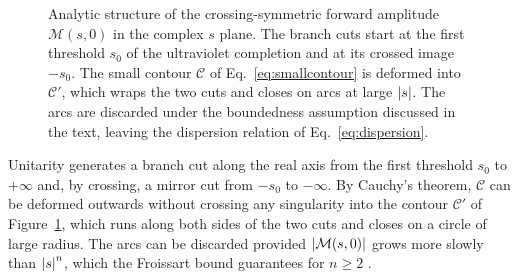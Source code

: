 \begin{figure}[tb]
\centering
{}
\caption[Analytic structure of the forward amplitude $\mathcal M(s,0)$ and the dispersive contour]{Analytic structure of the crossing-symmetric forward amplitude $\mathcal M(s,0)$ in the complex $s$ plane. The
branch cuts start at the first threshold $s_0$ of the ultraviolet completion and at its crossed image
$-s_0$. The small contour $\mathcal C$ of Eq.~\eqref{eq:smallcontour} is deformed into $\mathcal C'$,
which wraps the two cuts and closes on arcs at large $\abs{s}$. The arcs are discarded under the
boundedness assumption discussed in the text, leaving the dispersion relation
of Eq.~\eqref{eq:dispersion}.}
\label{fig:contour}
\end{figure}

Unitarity generates a branch cut along the real axis from the first threshold $s_0$ to $+\infty$
and, by crossing, a mirror cut from $-s_0$ to $-\infty$. By Cauchy's theorem, $\mathcal C$ can be deformed outwards without crossing any singularity into the
contour $\mathcal C'$ of Figure~\ref{fig:contour}, which runs along both sides of the two cuts and
closes on a circle of large radius. The
arcs can be discarded provided $\abs{\mathcal M(s,0)}$ grows more slowly than $\abs{s}^{n}$, which
the Froissart bound guarantees for $n\ge2$ \cite{Froissart:1961ux}.

